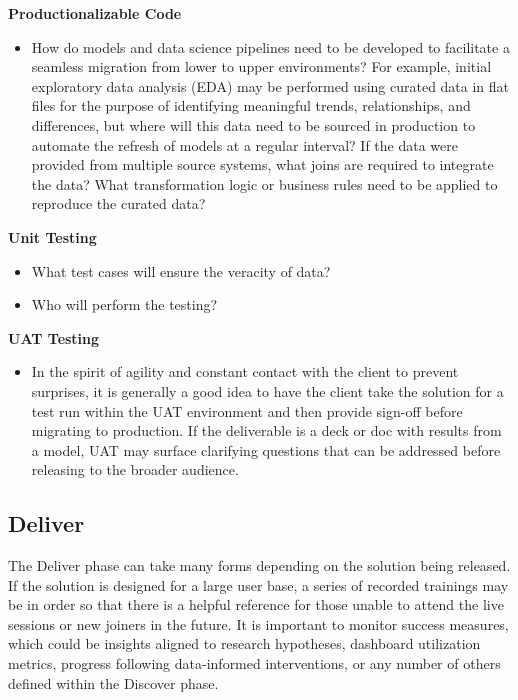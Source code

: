 \documentclass[
]{book}
\providecommand{\tightlist}{%
  \setlength{\itemsep}{0pt}\setlength{\parskip}{0pt}}
\begin{document}
\textbf{Productionalizable Code}

\begin{itemize}
\tightlist
\item
  How do models and data science pipelines need to be developed to facilitate a seamless migration from lower to upper environments? For example, initial exploratory data analysis (EDA) may be performed using curated data in flat files for the purpose of identifying meaningful trends, relationships, and differences, but where will this data need to be sourced in production to automate the refresh of models at a regular interval? If the data were provided from multiple source systems, what joins are required to integrate the data? What transformation logic or business rules need to be applied to reproduce the curated data?
\end{itemize}

\textbf{Unit Testing}

\begin{itemize}
\tightlist
\item
  What test cases will ensure the veracity of data?
\item
  Who will perform the testing?
\end{itemize}

\textbf{UAT Testing}

\begin{itemize}
\tightlist
\item
  In the spirit of agility and constant contact with the client to prevent surprises, it is generally a good idea to have the client take the solution for a test run within the UAT environment and then provide sign-off before migrating to production. If the deliverable is a deck or doc with results from a model, UAT may surface clarifying questions that can be addressed before releasing to the broader audience.
\end{itemize}

\hypertarget{deliver}{%
\subsection{Deliver}\label{deliver}}

The Deliver phase can take many forms depending on the solution being released. If the solution is designed for a large user base, a series of recorded trainings may be in order so that there is a helpful reference for those unable to attend the live sessions or new joiners in the future. It is important to monitor success measures, which could be insights aligned to research hypotheses, dashboard utilization metrics, progress following data-informed interventions, or any number of others defined within the Discover phase.
\end{document}
